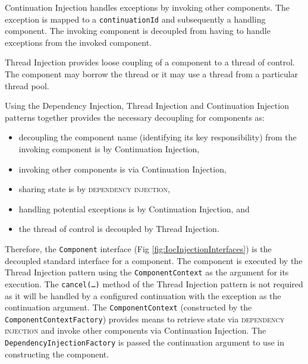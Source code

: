 \documentclass[prodmode]{style/acmlarge}
\begin{document}
Continuation Injection handles exceptions by invoking other components. The
exception is mapped to a \texttt{continuationId} and subsequently a handling
component.  The invoking component is decoupled from having to handle exceptions
from the invoked component.

Thread Injection provides loose coupling of a component to a thread of control.
The component may borrow the thread or it may use a thread from a particular
thread pool.

Using the Dependency Injection, Thread Injection and Continuation Injection
patterns together provides the necessary decoupling for components as:
\begin{itemize}
  \item decoupling the component name (identifying its key responsibility) from the invoking component is by Continuation Injection,
  \item invoking other components is via Continuation Injection,
  \item sharing state is by \textsc{dependency injection},
  \item handling potential exceptions is by Continuation Injection, and
  \item the thread of control is decoupled by Thread Injection.
\end{itemize}

Therefore, the \texttt{Component} interface (Fig
\ref{fig:IocInjectionInterfaces}) is the decoupled standard interface for a
component.  The component is executed by the Thread Injection pattern using the
\texttt{ComponentContext} as the argument for its execution.  The
\texttt{cancel(\ldots)} method of the Thread Injection pattern is not required
as it will be handled by a configured continuation with the exception as the
continuation argument.  The \texttt{ComponentContext} (constructed by the
\texttt{ComponentContextFactory}) provides means to retrieve state via
\textsc{dependency injection} and invoke other components via Continuation
Injection.  The \texttt{DependencyInjectionFactory} is passed the continuation
argument to use in constructing the component.
\end{document}
